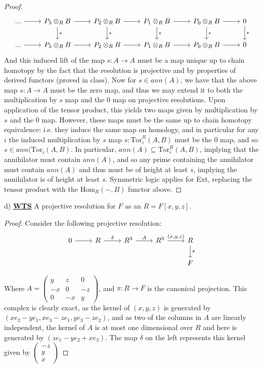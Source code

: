\documentclass{article}
\newcommand{\Hom}{\text{Hom}}
\newcommand{\Tor}{\text{Tor}}
\begin{document}
\begin{proof}
  \[
\begin{tikzcd}
... \arrow[r] & P_3\otimes_{R}B \arrow[r] \arrow[d,"s"] & P_2\otimes_{R}B \arrow[r] \arrow[d,"s"] & P_1\otimes_{R}B \arrow[r] \arrow[d,"s"] & P_0\otimes_{R}B \arrow[r] \arrow[d,"s"] & 0 \arrow[d,"s"] \\
... \arrow[r] & P_3\otimes_{R}B \arrow[r]           & P_2\otimes_{R}B \arrow[r]           & P_1\otimes_{R}B \arrow[r]           & P_0\otimes_{R}B \arrow[r]           & 0          
\end{tikzcd}
\]
And this induced lift of the map $s: A \to A$ must be a map unique up to chain homotopy by the fact that the resolution is projective and by properties of derived functors (proved in class). Now for $s \in ann(A)$, we have that the above map $s:A \to A$ must be the zero map, and thus we may extend it to both the multiplication by $s$ map and the $0$ map on projective resolutions. Upon application of the tensor product, this yields two maps given by multiplication by $s$ and the $0$ map. However, these maps must be the same up to chain homotopy equivalence: i.e. they induce the same map on homology, and in particular for any $i$ the induced multiplication by $s$ map $s: \Tor_{i}^{R}(A,B)$ must be the $0$ map, and so $s \in ann(\Tor_{i}(A,B)$. In particular, $ann(A) \subseteq \Tor_{i}^{R}(A,B)$, implying that the annihilator must contain $ann(A)$, and so any prime containing the annihilator must contain $ann(A)$ and thus must be of height at least $s$, implying the annihilator is of height at least $s$. Symmetric logic applies for Ext, replacing the tensor product with the $\Hom_{R}(-,B)$ functor above.
  \end{proof}

  d) \textbf{\underline{WTS}} A projective resolution for $F$ as an $R = F[x,y,z]$.
  \begin{proof}
  Consider the following projective resolution:
  \[
    \begin{tikzcd}
0 \arrow[r] & R^{} \arrow[r, "\delta"] & R^3 \arrow[r, "A"] & R^3 \arrow[r, "{(x, y, z)}"] & R \arrow[d, "\pi "] \\
            &                                                               &          &                              & F                  
          \end{tikzcd}
\]

Where $ A = \begin{pmatrix} y  & z & 0 \\ - x & 0 & -z \\ 0 & -x & y \end{pmatrix}$, and $\pi: R \to F$ is the canonical projection. This complex is clearly exact, as the kernel of $(x,y,z)$ is generated by $(xe_{2} - ye_{1}, xe_{3} - ze_{1}, ye_{3} - ze_{2})$, and as two of the columns in $A$ are linearly independent, the kernel of $A$ is at most one dimensional over $R$ and here is generated by $(ze_{1} - ye_{2} + xe_{3})$. The map $\delta$ on the left represents this kernel given by $
\begin{pmatrix}
  -z \\ y \\ x
\end{pmatrix}
$
\end{proof}
\end{document}
